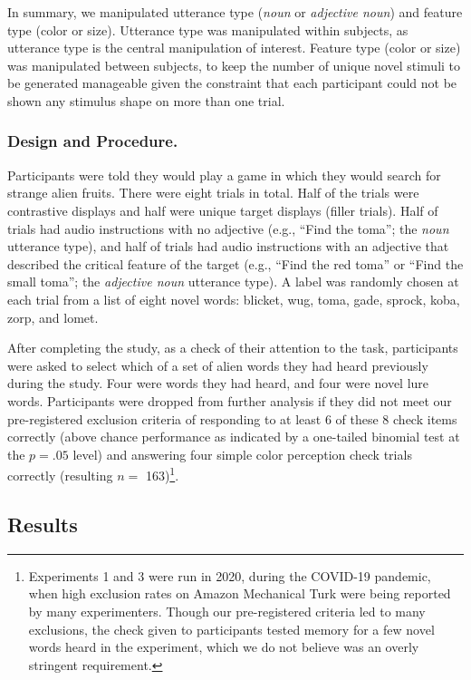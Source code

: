\documentclass[
  english,
  man,floatsintext]{apa6}
\begin{document}
In summary, we manipulated utterance type (\emph{noun} or \emph{adjective noun}) and feature type (color or size). Utterance type was manipulated within subjects, as utterance type is the central manipulation of interest. Feature type (color or size) was manipulated between subjects, to keep the number of unique novel stimuli to be generated manageable given the constraint that each participant could not be shown any stimulus shape on more than one trial.

\hypertarget{design-and-procedure.}{%
\subsubsection{Design and Procedure.}\label{design-and-procedure.}}

Participants were told they would play a game in which they would search for strange alien fruits. There were eight trials in total. Half of the trials were contrastive displays and half were unique target displays (filler trials). Half of trials had audio instructions with no adjective (e.g., ``Find the toma''; the \emph{noun} utterance type), and half of trials had audio instructions with an adjective that described the critical feature of the target (e.g., ``Find the red toma'' or ``Find the small toma''; the \emph{adjective noun} utterance type). A label was randomly chosen at each trial from a list of eight novel words: blicket, wug, toma, gade, sprock, koba, zorp, and lomet.

After completing the study, as a check of their attention to the task, participants were asked to select which of a set of alien words they had heard previously during the study. Four were words they had heard, and four were novel lure words. Participants were dropped from further analysis if they did not meet our pre-registered exclusion criteria of responding to at least 6 of these 8 check items correctly (above chance performance as indicated by a one-tailed binomial test at the \(p = .05\) level) and answering four simple color perception check trials correctly (resulting \(n =\) 163)\footnote{Experiments 1 and 3 were run in 2020, during the COVID-19 pandemic, when high exclusion rates on Amazon Mechanical Turk were being reported by many experimenters. Though our pre-registered criteria led to many exclusions, the check given to participants tested memory for a few novel words heard in the experiment, which we do not believe was an overly stringent requirement.}.

\hypertarget{results}{%
\subsection{Results}\label{results}}
\end{document}
